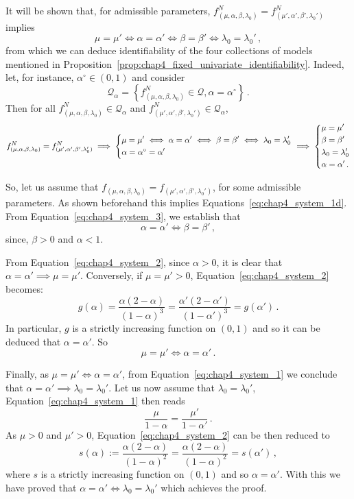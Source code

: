 \begin{subappendices}
  It will be shown that, for admissible parameters, $f_{(\mu, \alpha, \beta, \lambda_0)}^N = f_{(\mu', \alpha', \beta', \lambda_0')}^N$ implies \[\mu = \mu' \iff \alpha = \alpha' \iff \beta = \beta' \iff \lambda_0 = \lambda_0'\,,\]
  from which we can deduce identifiability of the four collections of models mentioned in Proposition~\ref{prop:chap4_fixed_univariate_identifiability}.
      Indeed, let, for instance, $\alpha^\circ \in (0, 1)$ and consider
  \[\mathcal{Q}_{\alpha} = \left\{f_{(\mu, \alpha, \beta, \lambda_0)}^N \in \mathcal{Q}, \alpha = \alpha^\circ \right\}\,.\]
  Then for all $f_{(\mu, \alpha, \beta, \lambda_0)}^N \in \mathcal Q_\alpha$ and $f_{(\mu', \alpha', \beta', \lambda_0')}^N \in \mathcal Q_\alpha$,
  \[
    f_{(\mu, \alpha, \beta, \lambda_0)}^N = f_{(\mu', \alpha', \beta', \lambda_0')}^N \implies 
  \begin{dcases}
  \mu = \mu' \iff \alpha = \alpha' \iff \beta = \beta' \iff \lambda_0 = \lambda_0'\\
  \alpha = \alpha^\circ = \alpha'
  \end{dcases} \implies
  \begin{dcases}
  \mu = \mu'\\
  \beta = \beta'\\
  \lambda_0=\lambda_0'\\
  \alpha = \alpha'\,.
  \end{dcases}
  \]
  
  So, let us assume that $f_{(\mu, \alpha, \beta, \lambda_0)} = f_{(\mu', \alpha', \beta', \lambda_0')}$,
  for some admissible parameters.
  As shown beforehand this implies Equations~\eqref{eq:chap4_system_1d}.
  From Equation~\eqref{eq:chap4_system_3}, we establish that \[\alpha = \alpha' \iff \beta = \beta'\,,\] since, $\beta > 0$ and $\alpha < 1$.
  
  From Equation~\eqref{eq:chap4_system_2}, since $\alpha > 0$, it is clear that $\alpha = \alpha' \implies \mu = \mu'$.  Conversely, if $\mu=\mu' > 0$, Equation~\eqref{eq:chap4_system_2} becomes:
  \[g(\alpha) =  \frac{\alpha (2-\alpha)}{(1-\alpha)^3} = \frac{\alpha' (2-\alpha')}{(1-\alpha')^3}  = g(\alpha')\,.\]
  In particular, $g$ is a strictly increasing function on $(0,1)$ and so it can be deduced that $\alpha = \alpha'$. So \[\mu = \mu' \iff \alpha = \alpha'\,.\]
  
  Finally, as $\mu = \mu' \iff \alpha = \alpha'$, from Equation~\eqref{eq:chap4_system_1} we conclude that $\alpha = \alpha' \implies \lambda_0 = \lambda_0'$. 
  Let us now assume that $\lambda_0 = \lambda_0'$, Equation~\eqref{eq:chap4_system_1} then reads \[\frac{\mu}{1-\alpha} = \frac{\mu'}{1-\alpha'}\,.\]
  As $\mu > 0$ and $\mu' > 0$, Equation~\eqref{eq:chap4_system_2} can be then reduced to \[s(\alpha) := \frac{\alpha(2-\alpha)}{(1-\alpha)^2} = \frac{\alpha(2-\alpha)}{(1-\alpha)^2} = s(\alpha')\,,\]
  where $s$ is a strictly increasing function on $(0,1)$ and so $\alpha = \alpha'$. With this we have proved that $\alpha = \alpha' \iff \lambda_0 = \lambda_0'$ which achieves the proof.







\end{subappendices}
